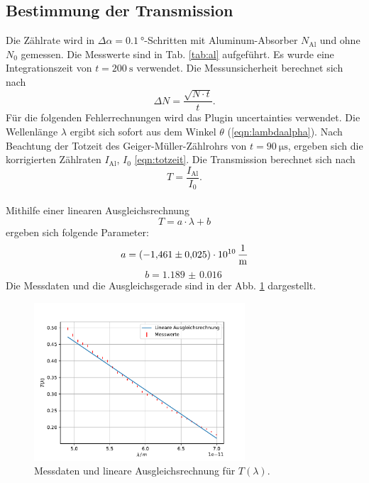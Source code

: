 \subsection{Bestimmung der Transmission}
\label{sec:transmission}
Die Zählrate wird in $\Delta\alpha=\SI{0.1}{\degree}$-Schritten mit Aluminum-Absorber $N_\text{Al}$ und ohne $N_0$ gemessen.
Die Messwerte sind in Tab. \ref{tab:al} aufgeführt.
Es wurde eine Integrationszeit von $t=\SI{200}{\second}$ verwendet.
Die Messunsicherheit berechnet sich nach
\begin{equation}
    \Delta N=\frac{\sqrt{N \cdot t}}{t} .
\end{equation}
Für die folgenden Fehlerrechnungen wird das Plugin uncertainties \cite{uncertainties} verwendet.
Die Wellenlänge $\lambda$ ergibt sich sofort aus dem Winkel $\theta$ (\autoref{eqn:lambdaalpha}).
Nach Beachtung der Totzeit des Geiger-Müller-Zählrohrs von $t=\SI{90}{\micro\second}$, ergeben sich die korrigierten Zählraten $I_\text{Al}$, $I_0$ \ref{eqn:totzeit}.
Die Transmission berechnet sich nach
\begin{equation*}
    T = \frac{I_\text{Al}}{I_0} .
\end{equation*}
\\
Mithilfe einer linearen Ausgleichsrechnung
\begin{equation}
    T = a \cdot \lambda + b
    \label{eqn:gerade}
\end{equation}
ergeben sich folgende Parameter:
\begin{equation*}
    a = \SI{-1.461(25)e10}{\frac{1}{\metre}}
\end{equation*}
\begin{equation*}
    b = \SI{1.189(16)}{}
\end{equation*}
Die Messdaten und die Ausgleichsgerade sind in der Abb. \ref{fig:trans} dargestellt.
\begin{figure}
    \centering
    \includegraphics[width=0.7\textwidth]{content/data/linear.pdf}
    \caption{Messdaten und lineare Ausgleichsrechnung für $T(\lambda)$. \cite{matplotlib} \cite{scipy}}
    \label{fig:trans}
\end{figure}

